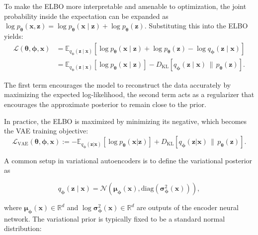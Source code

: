 \documentclass[10pt,twocolumn,article]{memoir}
\begin{document}
To make the ELBO more interpretable and amenable to optimization, the joint probability inside the expectation can be expanded as $\log p_{\boldsymbol{\theta}}(\mathbf{x}, \mathbf{z}) = \log p_{\boldsymbol{\theta}}(\mathbf{x} \mid \mathbf{z}) + \log p_{\boldsymbol{\theta}}(\mathbf{z})$. Substituting this into the ELBO yields:
\begin{align}
    \mathcal{L}(\boldsymbol{\theta}, \boldsymbol{\phi}, \mathbf{x})
    &= \mathbb{E}_{q_{\boldsymbol{\phi}}(\mathbf{z} \mid \mathbf{x})}
    \left[ \log p_{\boldsymbol{\theta}}(\mathbf{x} \mid \mathbf{z}) + \log p_{\boldsymbol{\theta}}(\mathbf{z}) - \log q_{\boldsymbol{\phi}}(\mathbf{z} \mid \mathbf{x}) \right] \\
    &= \mathbb{E}_{q_{\boldsymbol{\phi}}(\mathbf{z} \mid \mathbf{x})}
    \left[ \log p_{\boldsymbol{\theta}}(\mathbf{x} \mid \mathbf{z}) \right]
    - D_{\mathrm{KL}}\left[ q_{\boldsymbol{\phi}}(\mathbf{z} \mid \mathbf{x}) \,\|\, p_{\boldsymbol{\theta}}(\mathbf{z}) \right].
\end{align}

The first term encourages the model to reconstruct the data accurately by maximizing the expected log-likelihood, the second term acts as a regularizer that encourages the approximate posterior to remain close to the prior.

In practice, the ELBO is maximized by minimizing its negative, which becomes the VAE training objective:
\begin{equation}
\label{eq:loss_vae}
    \mathcal{L}_{\text{VAE}}(\boldsymbol{\theta}, \boldsymbol{\phi}, \mathbf{x}) :=
    - \mathbb{E}_{q_{\boldsymbol{\phi}}(\mathbf{z} | \mathbf{x})} [\log p_{\boldsymbol{\theta}}(\mathbf{x} | \mathbf{z})]
    + D_{\mathrm{KL}}[ q_{\boldsymbol{\phi}}(\mathbf{z} | \mathbf{x}) \,\|\, p_{\boldsymbol{\theta}}(\mathbf{z})].
\end{equation}

A common setup in variational autoencoders is to define the variational posterior as

\begin{equation}
\label{eq:reparam_posterior}
    q_{\boldsymbol{\phi}}(\mathbf{z} \mid \mathbf{x}) = \mathcal{N}(\boldsymbol{\mu}_{\boldsymbol{\phi}}(\mathbf{x}), \mathrm{diag}(\boldsymbol{\sigma}_{\boldsymbol{\phi}}^2(\mathbf{x}))),
\end{equation}

where $\boldsymbol{\mu}_{\boldsymbol{\phi}}(\mathbf{x}) \in \mathbb{R}^d$ and $\log \boldsymbol{\sigma}_{\boldsymbol{\phi}}^2(\mathbf{x}) \in \mathbb{R}^d$ are outputs of the encoder neural network. The variational prior is typically fixed to be a standard normal distribution:
\end{document}
